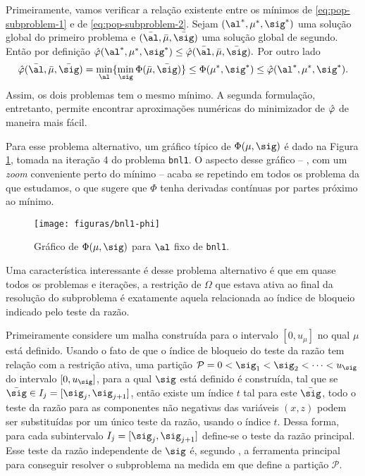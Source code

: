 Primeiramente, vamos verificar a relação existente entre os mínimos de \eqref{eq:pop-subproblem-1} e de \eqref{eq:pop-subproblem-2}. Sejam $(\al^*,\mu^*,\sig^*)$ uma solução global do  primeiro problema e $(\bar{\al}, \bar{\mu},\bar{\sig})$ uma solução global de segundo. Então por definição
$ \nextphi(\al^*,\mu^*,\sig^*) \leq \nextphi (\bar{\al},\bar{\mu},\bar{\sig}).$
Por outro lado 
\[
\nextphi(\baral,\barmu,\barsig) = \min_{\al}\{ \min_{\sig}\Phi(\barmu,\barsig)\} \leq \Phi(\mu^{*},\sig^{*}) \leq \nextphi(\al^*,\mu^*,\sig^*).
\]
Assim, os dois problemas tem o mesmo mínimo. A segunda formulação, entretanto, permite encontrar aproximações numéricas do minimizador de $\hat{\varphi}$ de maneira mais fácil. 

Para esse problema alternativo, um gráfico típico de $\Phi(\mu,\sig)$ é dado na Figura \ref{fig:bnl1-Phi}, tomada na iteração \num{4} do problema \texttt{bnl1}. O aspecto desse gráfico -- , com um \emph{zoom} conveniente perto do mínimo --  acaba se repetindo  em todos os problema da  que estudamos, o que sugere que $\Phi$ tenha derivadas contínuas por partes próximo ao mínimo.

\begin{figure}[htbp]
\centering
\texttt{[image: figuras/bnl1-phi]}
  	\caption{\label{fig:bnl1-Phi} Gráfico de $\Phi(\mu,\sig)$ para $\al$ fixo de \texttt{bnl1}.}
  \end{figure}

 Uma característica interessante é desse problema alternativo é que em quase todos os problemas e iterações, a restrição de $\Omega$ que estava ativa ao final da resolução do subproblema é exatamente aquela relacionada ao índice de bloqueio indicado pelo teste da razão.

Primeiramente considere  um malha construída para o intervalo $[0,u_{\mu}]$ no qual  $\mu$ está definido. Usando o fato de que o índice de bloqueio do teste da razão tem relação com a restrição ativa, uma partição $\mathcal{P} = 0<\sig_{1}<\sig_{2}<\cdots<u_{\sig}$ do intervalo $[0,u_{\sig}]$, para  a  qual $\sig$ está definido é construída, tal que se $\barsig\in I_{j} = [\sig_{j},\sig_{j+1}]$, então existe um índice $t$ tal para este $\barsig$, todo o teste da razão para as componentes não negativas das variáveis $(x,z)$ podem ser substituídas por um único teste da razão, usando o índice $t$. Dessa forma, para cada subintervalo $I_{j} = [\sig_{j},\sig_{j+1}]$ define-se o teste da razão principal. Esse teste da razão independente de $\sig$ é, segundo \textcite{VillasBoas:2012ur,VillasBoas2013:wn}, a ferramenta principal para conseguir resolver o subproblema na medida em que define a partição $\mathcal{P}$.

